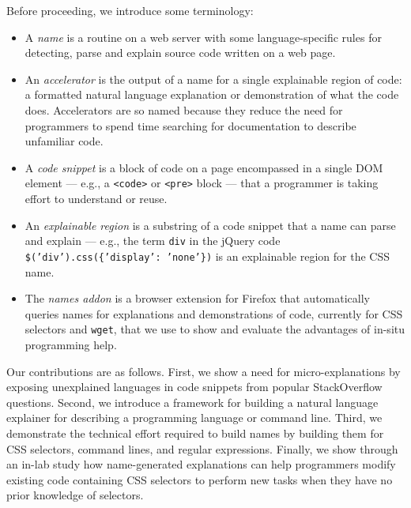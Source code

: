 Before proceeding, we introduce some terminology:
\begin{itemize}
\item A \emph{\gls{name}} is a routine on a web server with some language-specific rules for detecting, parse and explain source code written on a web page.
\item An \emph{accelerator} is the output of a \gls{name} for a single explainable region of code: a formatted natural language explanation or demonstration of what the code does.  Accelerators are so named because they reduce the need for programmers to spend time searching for documentation to describe unfamiliar code.
\item A \emph{code snippet} is a block of code on a page encompassed in a single DOM element --- e.g., a \texttt{<code>} or \texttt{<pre>} block --- that a programmer is taking effort to understand or reuse.
\item An \emph{explainable region} is a substring of a code snippet that a \gls{name} can parse and explain --- e.g., the term \texttt{div} in the jQuery code \texttt{\$('div').css(\{'display': 'none'\})} is an explainable region for the CSS \gls{name}.
\item The \emph{\Glspl{name} addon} is a browser extension for Firefox that automatically queries \glspl{name} for explanations and demonstrations of code, currently for CSS selectors and \texttt{wget}, that we use to show and evaluate the advantages of in-situ programming help.
\end{itemize}

Our contributions are as follows.
First, we show a need for micro-explanations by exposing unexplained languages in code snippets from popular StackOverflow questions.
Second, we introduce a framework for building a natural language explainer for describing a programming language or command line.
Third, we demonstrate the technical effort required to build \glspl{name} by building them for CSS selectors, command lines, and regular expressions.
Finally, we show through an in-lab study how \gls{name}-generated explanations can help programmers modify existing code containing CSS selectors to perform new tasks when they have no prior knowledge of selectors. 

